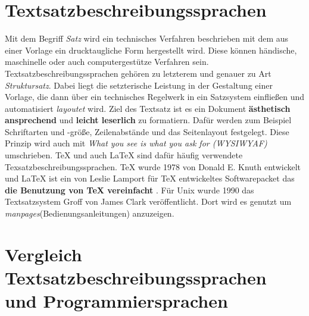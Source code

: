 \section{Textsatzbeschreibungssprachen}
Mit dem Begriff \textit{Satz} wird ein technisches Verfahren beschrieben mit dem aus einer Vorlage ein drucktaugliche Form hergestellt wird. Diese können händische, maschinelle oder auch computergestütze Verfahren sein. Textsatzbeschreibungssprachen gehören zu letzterem und genauer zu Art \textit{Struktursatz}. Dabei liegt die setzterische Leistung in der Gestaltung einer Vorlage, die dann über ein technisches Regelwerk in ein Satzsystem einfließen und automatisiert \textit{layoutet} wird. Ziel des Textsatz ist es ein Dokument \textbf{ästhetisch ansprechend} und \textbf{leicht leserlich} zu formatiern. Dafür werden zum Beispiel Schriftarten und -größe, Zeilenabstände und das Seitenlayout festgelegt\nocite{satzwiki:2023}. Diese Prinzip wird auch mit \textit{What you see is what you ask for (WYSIWYAF)} umschrieben.
TeX und auch LaTeX sind dafür häufig verwendete Texsatzbeschreibungssprachen. TeX wurde 1978 von Donald E. Knuth entwickelt und LaTeX ist ein von Leslie Lamport für TeX entwickeltes Softwarepacket das \textbf{die Benutzung von TeX vereinfacht}\nocite{tex:2023} \nocite{latex:2023}. Für Unix wurde 1990 das Textsatzsystem Groff von James Clark veröffentlicht. Dort wird es genutzt um \textit{manpages}(Bedienungsanleitungen) anzuzeigen\nocite{groff:2022}.

\section{Vergleich Textsatzbeschreibungssprachen und Programmiersprachen}


